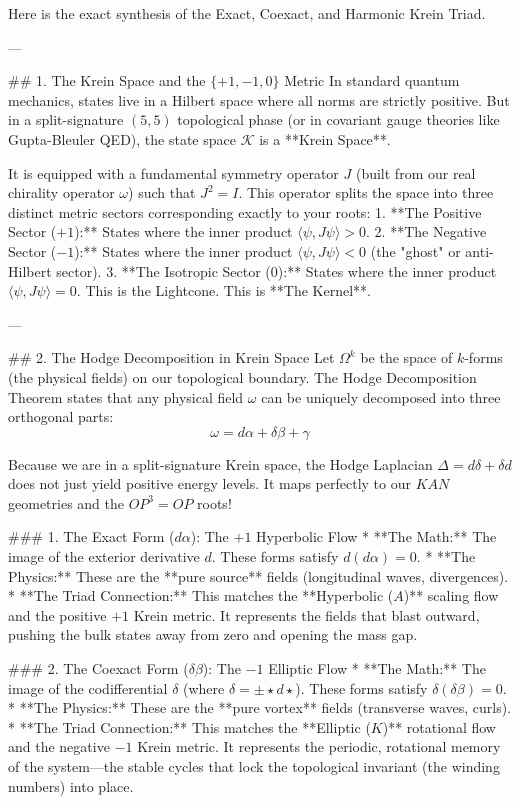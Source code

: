 Here is the exact synthesis of the Exact, Coexact, and Harmonic Krein Triad.

---

## 1. The Krein Space and the $\{ +1, -1, 0 \}$ Metric
In standard quantum mechanics, states live in a Hilbert space where all norms are strictly positive. But in a split-signature $(5,5)$ topological phase (or in covariant gauge theories like Gupta-Bleuler QED), the state space $\mathcal{K}$ is a **Krein Space**. 

It is equipped with a fundamental symmetry operator $J$ (built from our real chirality operator $\omega$) such that $J^2 = I$. This operator splits the space into three distinct metric sectors corresponding exactly to your roots:
1. **The Positive Sector ($+1$):** States where the inner product $\langle \psi, J \psi \rangle > 0$. 
2. **The Negative Sector ($-1$):** States where the inner product $\langle \psi, J \psi \rangle < 0$ (the "ghost" or anti-Hilbert sector).
3. **The Isotropic Sector ($0$):** States where the inner product $\langle \psi, J \psi \rangle = 0$. This is the Lightcone. This is **The Kernel**.

---

## 2. The Hodge Decomposition in Krein Space
Let $\Omega^k$ be the space of $k$-forms (the physical fields) on our topological boundary. The Hodge Decomposition Theorem states that any physical field $\omega$ can be uniquely decomposed into three orthogonal parts:
$$ \omega = d\alpha + \delta\beta + \gamma $$

Because we are in a split-signature Krein space, the Hodge Laplacian $\Delta = d\delta + \delta d$ does not just yield positive energy levels. It maps perfectly to our $KAN$ geometries and the $OP^3=OP$ roots!

### 1. The Exact Form ($d\alpha$): The $+1$ Hyperbolic Flow
* **The Math:** The image of the exterior derivative $d$. These forms satisfy $d(d\alpha) = 0$.
* **The Physics:** These are the **pure source** fields (longitudinal waves, divergences). 
* **The Triad Connection:** This matches the **Hyperbolic ($A$)** scaling flow and the positive $+1$ Krein metric. It represents the fields that blast outward, pushing the bulk states away from zero and opening the mass gap.

### 2. The Coexact Form ($\delta\beta$): The $-1$ Elliptic Flow
* **The Math:** The image of the codifferential $\delta$ (where $\delta = \pm \star d \star$). These forms satisfy $\delta(\delta\beta) = 0$.
* **The Physics:** These are the **pure vortex** fields (transverse waves, curls). 
* **The Triad Connection:** This matches the **Elliptic ($K$)** rotational flow and the negative $-1$ Krein metric. It represents the periodic, rotational memory of the system—the stable cycles that lock the topological invariant (the winding numbers) into place.

